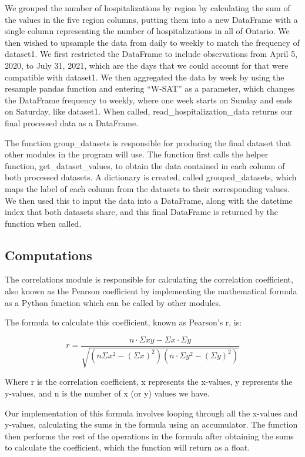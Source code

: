 \documentclass[fontsize=11pt]{article}
\begin{document}
\noindent
We grouped the number of hospitalizations by region by calculating the sum of the values in the five region columns, putting them into a new DataFrame with a single column representing the number of hospitalizations in all of Ontario. We then wished to upsample the data from daily to weekly to match the frequency of dataset1. We first restricted the DataFrame to include observations from April 5, 2020, to July 31, 2021, which are the days that we could account for that were compatible with dataset1. We then aggregated the data by week by using the resample pandas function and entering “W-SAT” as a parameter, which changes the DataFrame frequency to weekly, where one week starts on Sunday and ends on Saturday, like dataset1. When called, read\_hospitalization\_data returns our final processed data as a DataFrame.  

\noindent
The function group\_datasets is responsible for producing the final dataset that other modules in the program will use. The function first calls the helper function, get\_dataset\_values, to obtain the data contained in each column of both processed datasets. A dictionary is created, called grouped\_datasets, which maps the label of each column from the datasets to their corresponding values. We then used this to input the data into a DataFrame, along with the datetime index that both datasets share, and this final DataFrame is returned by the function when called.

\subsection*{Computations}
The correlations module is responsible for calculating the correlation coefficient, also known as the Pearson coefficient by implementing the mathematical formula as a Python function which can be called by other modules.

The formula to calculate this coefficient, known as Pearson’s r, is:

$$r = \frac{n \cdot \Sigma xy - \Sigma x \cdot \Sigma y}{ \sqrt{(n \Sigma x^2 - (\Sigma x)^2)(n \cdot \Sigma y^2  - (\Sigma y)^2) }}$$

Where r is the correlation coefficient, x represents the x-values, y represents the y-values, and n is the number of x (or y) values we have.

\noindent
Our implementation of this formula involves looping through all the x-values and y-values, calculating the sums in the formula using an accumulator. The function then performs the rest of the operations in the formula after obtaining the sums to calculate the coefficient, which the function will return as a float.
\end{document}
